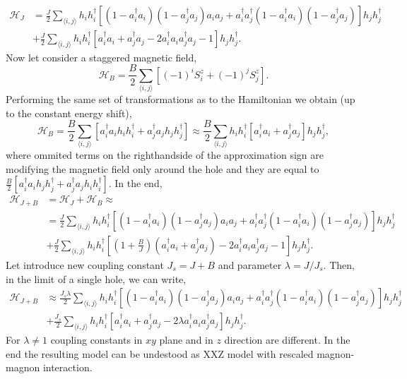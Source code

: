 \documentclass[12pt, a4paper]{article}
\newcommand{\mean}[1]{\langle#1\rangle}
\begin{document}
\begin{equation}
	\begin{aligned}
	\mathcal{H}_{J} &= \frac{J}{2}\sum_{\mean{i,j}} h_i h_i^\dag \left[(1 - a_i^\dag a_i)(1 - a_j^\dag a_j)a_i a_j + a_i^\dag a_j^\dag (1 - a_i^\dag a_i)(1 - a_j^\dag a_j) \right] h_j h_j^\dag \\
	&+ \frac{J}{2} \sum_{\mean{i,j}} h_i h_i^\dag \left[a_i^\dag a_i + a_j^\dag a_j - 2 a_i^\dag a_i a_j^\dag a_j - 1\right] h_j h_j^\dag.
	\end{aligned}
	\label{eq:hj}
\end{equation}
Now let consider a staggered magnetic field,
\begin{equation}
	\mathcal{H}_{B} = \frac{B}{2} \sum_{\mean{i,j}} \left[(-1)^i S^z_i + (-1)^j S^z_j\right].
\end{equation}
Performing the same set of transformations as to the Hamiltonian we obtain (up to the constant energy shift),
\begin{equation}
	\mathcal{H}_{B} = \frac{B}{2} \sum_{\mean{i,j}} 
	\left[a_i^\dag a_i h_i h_i^\dag + a_j^\dag a_j h_j h_j^\dag \right] \approx \frac{B}{2} \sum_{\mean{i,j}} 
	h_i h_i^\dag \left[a_i^\dag a_i + a_j^\dag a_j \right] h_j h_j^\dag,
\end{equation}
where ommited terms on the righthandside of the approximation sign are modifying the magnetic field only around the hole and they are equal to $\frac{B}{2} \left[ a_i^\dag a_i h_j h_j^\dag + a_j^\dag a_j h_i h_i^\dag \right]$. In the end,
\begin{equation}
	\begin{aligned}
	\mathcal{H}_{J+B} &= \mathcal{H}_{J} + \mathcal{H}_{B} \approx \\
	&= \frac{J}{2}\sum_{\mean{i,j}} h_i h_i^\dag \left[(1 - a_i^\dag a_i)(1 - a_j^\dag a_j)a_i a_j + a_i^\dag a_j^\dag (1 - a_i^\dag a_i)(1 - a_j^\dag a_j) \right] h_j h_j^\dag \\
	&+ \frac{J}{2} \sum_{\mean{i,j}} h_i h_i^\dag \left[\left(1+\frac{B}{J}\right)\left(a_i^\dag a_i + a_j^\dag a_j\right) - 2 a_i^\dag a_i a_j^\dag a_j - 1\right] h_j h_j^\dag.
	\end{aligned}
\end{equation}
Let introduce new coupling constant $J_s = J + B$ and parameter $\lambda = J / J_s$. Then, in the limit of a single hole, we can write,
\begin{equation}
	\begin{aligned}
	\mathcal{H}_{J+B} 
	&\approx \frac{J_s \lambda}{2}\sum_{\mean{i,j}} h_i h_i^\dag \left[(1 - a_i^\dag a_i)(1 - a_j^\dag a_j)a_i a_j + a_i^\dag a_j^\dag (1 - a_i^\dag a_i)(1 - a_j^\dag a_j) \right] h_j h_j^\dag  \\
	&+ \frac{J_s}{2} \sum_{\mean{i,j}} h_i h_i^\dag \left[a_i^\dag a_i + a_j^\dag a_j - 2\lambda a_i^\dag a_i a_j^\dag a_j \right] h_j h_j^\dag.
	\end{aligned}
\end{equation}
For $\lambda \neq 1$ coupling constants in $xy$ plane and in $z$ direction are different. In the end the resulting model can be undestood as XXZ model with rescaled magnon-magnon interaction.



\end{document}
